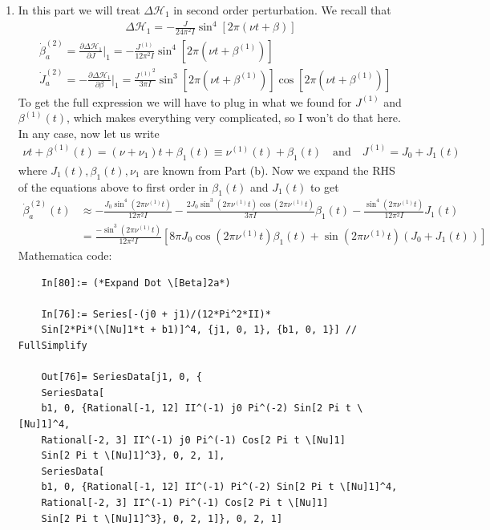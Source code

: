 \documentclass{article}
\theoremstyle{definition}
\newcommand{\p}{\partial}
\newcommand{\ham}{\mathcal{H}}
\newcommand{\be}{\beta}
\newcommand{\f}[2]{\frac{#1}{#2}}
\newcommand{\lp}{\left(}
\newcommand{\rp}{\right)}
\newcommand{\lb}{\left[}
\newcommand{\rb}{\right]}
\begin{document}
\begin{enumerate}[label=(\alph*)]
	\item In this part we will treat $\Delta \ham_1$ in second order perturbation. We recall that
	\begin{align*}
	\Delta \ham_1 = -\f{J}{24\pi^2 I } \sin^4[2\pi(\nu t + \be)]
	\end{align*}
	\begin{align*}
	&\dot \be^{(2)}_a = \f{\p \Delta \ham_1}{\p J}\bigg\vert_1 = \boxed{{- \f{J^{(1)}}{12\pi^2 I } \sin^4\lb 2\pi( \nu t + \be^{(1)})\rb}}\\
	&\dot J^{(2)}_a = -\f{\p \Delta \ham_1}{\p \be} \bigg\vert_1 = \boxed{{\f{{J^{(1)}}^2}{3\pi I} \sin^3\lb 2\pi\lp \nu t + \be^{(1)}\rp \rb \cos\lb 2\pi(\nu t + \be^{(1)})\rb }}
	\end{align*}
	To get the full expression we will have to plug in what we found for $J^{(1)}$ and $\be^{(1)}(t)$, which makes everything very complicated, so I won't do that here. In any case, now let us write
	\begin{align*}
	\nu t + \be^{(1)}(t) = (\nu + \nu_1)t + \be_1(t) \equiv \nu^{(1)}(t) + \be_1(t) \quad\text{and}\quad J^{(1)} = J_0 + J_1(t)
	\end{align*}
	where $J_1(t), \be_1(t),\nu_1$  are known from Part (b). Now we expand the RHS of the equations above to first order in $\be_1(t)$ and $J_1(t)$ to get
	\begin{align*}
	\dot \be_a^{(2)}(t) 
	&\approx 
	-\frac{J_0 \sin^4(2 \pi  \nu^{(1)} t)}{12 \pi ^2 I}
	-\frac{2  J_0 \sin^3(2 \pi  \nu^{(1)} t) \cos (2 \pi \nu^{(1)} t)}{3 \pi I}  \be_1(t)
	-\frac{\sin^4(2 \pi \nu^{(1)} t)}{12 \pi ^2 I} J_1(t)  \\
	&= \f{-\sin ^3(2 \pi  \nu^{(1)} t)}{12 \pi^2 I }\lb  8 \pi J_0  \cos (2 \pi 
		\nu^{(1)} t)  \be_1(t)  +\sin (2 \pi  \nu^{(1)} t)  (J_0+ J_1(t))  \rb
	\end{align*}
	Mathematica code:
	\begin{lstlisting}
	In[80]:= (*Expand Dot \[Beta]2a*)
	
	In[76]:= Series[-(j0 + j1)/(12*Pi^2*II)*
	Sin[2*Pi*(\[Nu]1*t + b1)]^4, {j1, 0, 1}, {b1, 0, 1}] // FullSimplify
	
	Out[76]= SeriesData[j1, 0, {
	SeriesData[
	b1, 0, {Rational[-1, 12] II^(-1) j0 Pi^(-2) Sin[2 Pi t \[Nu]1]^4, 
	Rational[-2, 3] II^(-1) j0 Pi^(-1) Cos[2 Pi t \[Nu]1]
	Sin[2 Pi t \[Nu]1]^3}, 0, 2, 1], 
	SeriesData[
	b1, 0, {Rational[-1, 12] II^(-1) Pi^(-2) Sin[2 Pi t \[Nu]1]^4, 
	Rational[-2, 3] II^(-1) Pi^(-1) Cos[2 Pi t \[Nu]1]
	Sin[2 Pi t \[Nu]1]^3}, 0, 2, 1]}, 0, 2, 1]
	

\end{lstlisting}
\end{enumerate}
\end{document}
